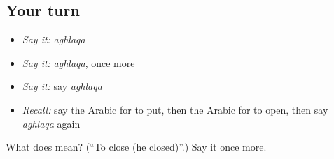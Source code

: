 \subsection*{Your turn}
\begin{itemize}
\raggedright
  \item \emph{Say it:} \emph{aghlaqa}
  \item \emph{Say it:} \emph{aghlaqa}, once more
  \item \emph{Say it:} say \emph{aghlaqa}
  \item \emph{Recall:} say the Arabic for to put, then the Arabic for to open, then say \emph{aghlaqa} again
\end{itemize}

\begin{tcolorbox}[breakable,colback=teal!4,colframe=teal!35!black,title={Before you move on}]
What does  mean? (\textquotedblleft{}To close (he closed)\textquotedblright{}.) Say it once more.
\end{tcolorbox}
